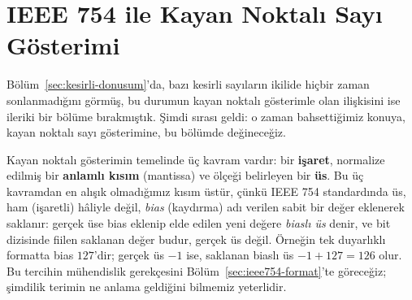 \section{IEEE 754 ile Kayan Noktalı Sayı Gösterimi}
\label{sec:ieee754}

Bölüm~\ref{sec:kesirli-donusum}'da, bazı kesirli sayıların ikilide hiçbir zaman
sonlanmadığını görmüş, bu durumun kayan noktalı gösterimle olan ilişkisini ise ileriki bir
bölüme bırakmıştık. Şimdi sırası geldi: o zaman bahsettiğimiz konuya, kayan noktalı sayı
gösterimine, bu bölümde değineceğiz.

Kayan noktalı gösterimin temelinde üç kavram vardır: bir \textbf{işaret}, normalize edilmiş
bir \textbf{anlamlı kısım} (mantissa) ve ölçeği belirleyen bir \textbf{üs}. Bu üç kavramdan
en alışık olmadığımız kısım üstür, çünkü IEEE 754 standardında üs, ham (işaretli) hâliyle
değil, \emph{bias} (kaydırma) adı verilen sabit bir değer eklenerek saklanır: gerçek üse bias
eklenip elde edilen yeni değere \emph{biaslı üs} denir, ve bit dizisinde fiilen saklanan
değer budur, gerçek üs değil. Örneğin tek duyarlıklı formatta bias $127$'dir; gerçek üs
$-1$ ise, saklanan biaslı üs $-1+127=126$ olur. Bu tercihin mühendislik gerekçesini
Bölüm~\ref{sec:ieee754-format}'te göreceğiz; şimdilik terimin ne anlama geldiğini bilmemiz
yeterlidir.

